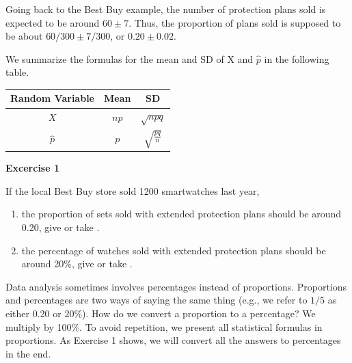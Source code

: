 \documentclass[11pt, chapterprefix=true]{scrbook}\usepackage[]{graphicx}\usepackage[]{color}
\begin{document}
Going back to the Best Buy example, the number of protection plans sold is expected to be around $60 \pm 7$.   Thus, the proportion of plans sold is supposed to be about $60/300 \pm 7/300$, or $0.20 \pm 0.02$.

We summarize the formulas for the mean and SD of X and $\hat{p}$ in the following table.

\begin{table}[ht]
\centering
\begin{tabular}{@{} ccc @{}} \hline
Random Variable & Mean & SD \\ \hline
$X$ & $np$ & $\sqrt{npq}$ \\
$\hat{p}$ & $p$ & $\sqrt{\frac{pq}{n}}$  \\ \hline
\end{tabular}
\end{table}


\begin{minipage}[ht]{3cm}

\vspace{-31mm}

\textbf{Excercise 1}
\end{minipage}
\begin{minipage}[ht]{11cm}

\parbox{11cm}{
If the local Best Buy store sold 1200 smartwatches last year,

\begin{enumerate}
\item the proportion of sets sold with extended protection plans should be around 0.20, give or take \underline{\phantom{xxxxxxxx}}.
\item the percentage of watches sold with extended protection plans should be around 20\%, give or take \underline{\phantom{xxxxxxxx}}.
\end{enumerate}
}
\end{minipage}

Data analysis sometimes involves percentages instead of proportions.  Proportions and percentages are two ways of saying the same thing (e.g., we refer to $1/5$ as either 0.20 or 20\%).  How do we convert a proportion to a percentage?  We multiply by 100\%.  To avoid repetition, we present all statistical formulas in proportions.  As Exercise 1 shows, we will convert all the answers to percentages in the end.
\end{document}
